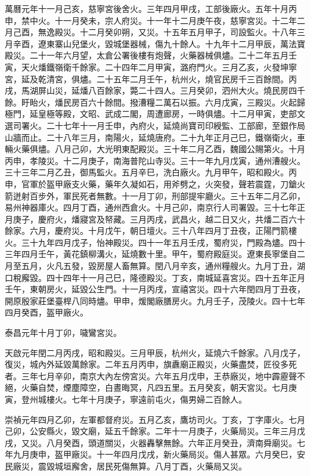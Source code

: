 \begin{pinyinscope}
萬曆元年十一月己亥，慈寧宮後舍火。三年四月甲戌，工部後廠火。五年十月丙申，禁中火。十一月癸未，宗人府災。十一年十二月庚午夜，慈寧宮災。十二年二月己酉，無逸殿災。十二月癸卯朔，又災。十五年五月甲子，司設監火。十八年三月辛酉，遼東寨山兒堡火，毀城堡器械，傷九十餘人。十九年十二月甲辰，萬法寶殿災。二十一年六月望，太倉公署後樓有炮聲，火藥器械俱燼。二十二年五月壬寅，天火燔鐵嶺衛千餘家。二十四年二月甲寅，潞府門火。三月乙亥，火發坤寧宮，延及乾清宮，俱燼。二十五年二月壬午，杭州火，燒官民房千三百餘間。丙戌，馬湖屏山災，延燔八百餘家，斃二十四人。三月癸卯，泗州大火。燒民房四千餘。盱眙火，燔民房百六十餘間。撥漕糧二萬石以振。六月戊寅，三殿災。火起歸極門，延皇極等殿，文昭、武成二閣，周遭廊房，一時俱燼。十二月甲寅，吏部文選司署火。二十七年十一月壬申，內府火，延燒尚寶司印綬監、工部廊，至銀作局山牆而止。二十八年三月，南陽火，延燒唐府。二十九年正月己巳，鐵嶺衛火，車輛火藥俱燼。八月己卯，大光明東配殿災。三十年二月乙酉，魏國公賜第火。十月丙申，孝陵災。十二月庚子，南海普陀山寺災。三十一年九月戊寅，通州漕艘火。三十三年二月乙丑，御馬監火。五月辛巳，洗白廠火。九月甲午，昭和殿火。丙申，官軍於盔甲廠支火藥，藥年久凝如石，用斧劈之，火突發，聲若震霆，刀鎗火箭迸射百步外，軍民死者無數。十一月丁卯，刑部提牢廳火。三十五年二月乙卯，易州神器庫火。四月丁酉，通州西倉火。十月己卯，南京行人司署毀。三十七年正月庚子，慶府火，燔寢宮及帑藏。三月丙戌，武昌火，越二日又火，共燔二百六十餘家。六月，慶府災。十月戊午，朝日壇火。三十八年四月丁丑夜，正陽門箭樓火。三十九年四月戊子，怡神殿災。四十一年五月壬戌，蜀府災，門殿為燼。四十三年四月壬午，黃花鎮柳溝火，延燒數十里。甲午，蜀府殿庭災。遼東長寧堡自二月至五月，火凡五發，毀房屋人畜無算。閏八月辛亥，通州糧艘火。九月丁丑，湖口稅廨毀。四十四年十一月己巳，隆德殿災。丁亥，南城延喜宮災。四十五年正月壬午，東朝房火，延毀公生門。十一月丙戌，宣禧宮災。四十六年閏四月丁丑夜，開原殷家莊堡臺桿八同時燼。甲申，煖閣廠膳房火。九月壬子，茂陵火。四十七年四月癸酉，盔甲廠火。

泰昌元年十月丁卯，噦鸞宮災。

天啟元年閏二月丙戌，昭和殿災。三月甲辰，杭州火，延燒六千餘家。八月戊子，復災，城內外延毀萬餘家。二年五月丙申，旗纛廟正殿災，火藥盡焚，匠役多死者。三年七月辛卯，南京大內左傍宮災。六年五月戊申，王恭廠災，地中霹靂聲不絕，火藥自焚，煙塵障空，白晝晦冥，凡四五里。五月癸亥，朝天宮災。七月庚寅，登州城樓火。七年十月庚子，寧遠前屯火，傷男婦二百餘人。

崇禎元年四月乙卯，左軍都督府災。五月乙亥，鷹坊司火。丁亥，丁字庫火。七月己卯，公安縣火，毀文廟，延五千餘家。二年十一月庚子，火藥局災。三年三月戊戌，又災。八月癸酉，頭道關災，火器轟擊無餘。六年正月癸丑，濟南舜廟災。七年九月庚申，盔甲廠災。十一年四月戊戌，新火藥局災。傷人甚眾。六月癸巳，安民廠災，震毀城垣廨舍，居民死傷無算。八月丁酉，火藥局又災。


\end{pinyinscope}
